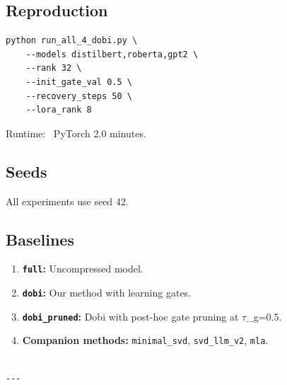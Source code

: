 \subsection{Reproduction}

\begin{lstlisting}
python run_all_4_dobi.py \
    --models distilbert,roberta,gpt2 \
    --rank 32 \
    --init_gate_val 0.5 \
    --recovery_steps 50 \
    --lora_rank 8
\end{lstlisting}

Runtime: ~PyTorch 2.0 minutes.

\subsection{Seeds}

All experiments use seed 42.

\subsection{Baselines}

\begin{enumerate}
\item \textbf{\texttt{full}:} Uncompressed model.
\item \textbf{\texttt{dobi}:} Our method with learning gates.
\item \textbf{\texttt{dobi\_pruned}:} Dobi with post-hoc gate pruning at $\tau$\_g=0.5.
\item \textbf{Companion methods:} \texttt{minimal\_svd}, \texttt{svd\_llm\_v2}, \texttt{mla}.
\end{enumerate}
\begin{lstlisting}

---
\end{lstlisting}